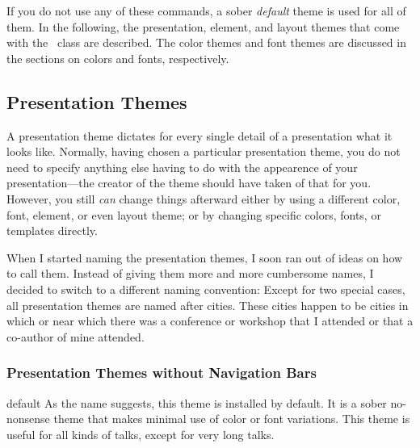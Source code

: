 
If you do not use any of these commands, a sober \emph{default} theme
is used for all of them. In the following, the presentation, element,
and layout themes that come with the \beamer\ class are described. The
color themes and font themes are discussed in the sections on colors
and fonts, respectively.



\subsection{Presentation Themes}

A presentation theme dictates for every single detail
of a presentation what it looks like. Normally, having chosen a
particular presentation theme, you do not need to specify anything
else having to do with the appearence of your presentation---the
creator of the theme should have taken of that for you. However, you
still \emph{can} change things afterward either by using a different
color, font, element, or even layout theme; or by changing specific
colors, fonts, or templates directly.

When I started naming the presentation themes, I soon ran out of ideas
on how to call them. Instead of giving them more and more cumbersome
names, I decided to switch to a different naming convention:
Except for two special cases, all presentation themes are named after
cities. These cities happen to be cities in which or near which there
was a conference or workshop that I attended or that a
co-author of mine attended. 


\subsubsection{Presentation Themes without Navigation Bars}

\begin{themeexample}{default}
  As the name suggests, this theme is installed by default. It is a
  sober no-nonsense theme that makes minimal use of color or font
  variations. This theme is useful for all kinds of talks, except for
  very long talks.
\end{themeexample}



